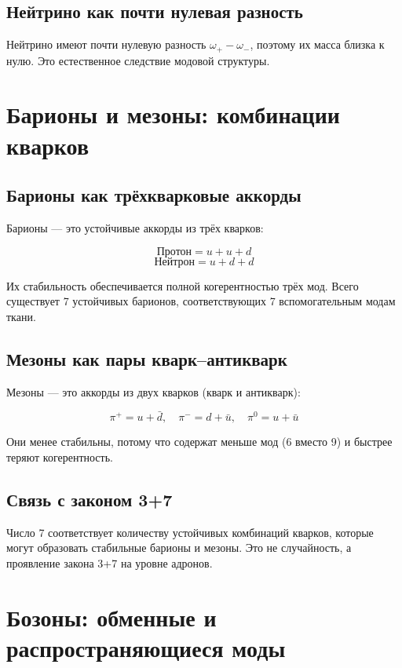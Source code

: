 \documentclass[12pt,a4paper]{article}
\begin{document}
\subsection{Нейтрино как почти нулевая разность}

Нейтрино имеют почти нулевую разность \(\omega_{+} - \omega_{-}\), поэтому их масса близка к нулю. Это естественное следствие модовой структуры.

\section{Барионы и мезоны: комбинации кварков}

\subsection{Барионы как трёхкварковые аккорды}

Барионы — это устойчивые аккорды из трёх кварков:

\[
\text{Протон} = u + u + d
\]
\[
\text{Нейтрон} = u + d + d
\]

Их стабильность обеспечивается полной когерентностью трёх мод. Всего существует 7 устойчивых барионов, соответствующих 7 вспомогательным модам ткани.

\subsection{Мезоны как пары кварк–антикварк}

Мезоны — это аккорды из двух кварков (кварк и антикварк):

\[
\pi^+ = u + \bar{d}, \quad \pi^- = d + \bar{u}, \quad \pi^0 = u + \bar{u}
\]

Они менее стабильны, потому что содержат меньше мод (6 вместо 9) и быстрее теряют когерентность.

\subsection{Связь с законом 3+7}

Число 7 соответствует количеству устойчивых комбинаций кварков, которые могут образовать стабильные барионы и мезоны. Это не случайность, а проявление закона 3+7 на уровне адронов.

\section{Бозоны: обменные и распространяющиеся моды}
\end{document}
